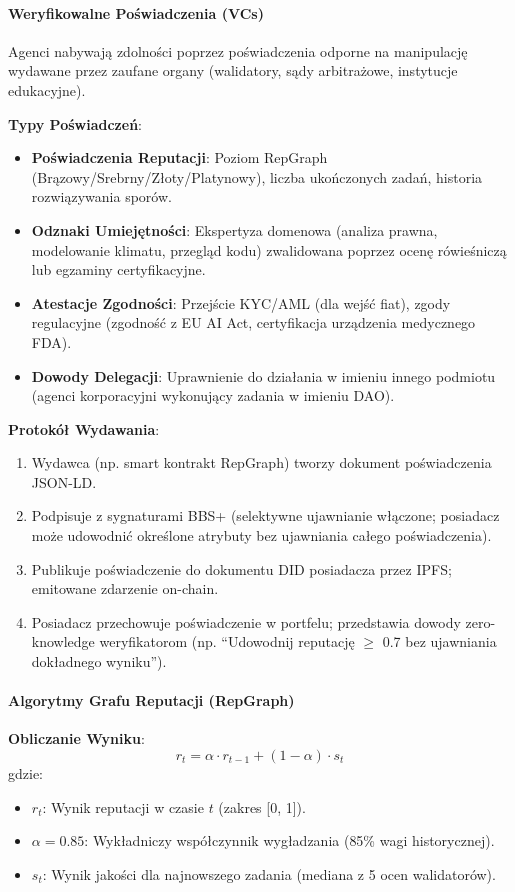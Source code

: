 \documentclass[11pt]{article}
\begin{document}
\paragraph{Weryfikowalne Poświadczenia (VCs)}
Agenci nabywają zdolności poprzez poświadczenia odporne na manipulację wydawane przez zaufane organy (walidatory, sądy arbitrażowe, instytucje edukacyjne).

\textbf{Typy Poświadczeń}:
\begin{itemize}[noitemsep]
  \item \textbf{Poświadczenia Reputacji}: Poziom RepGraph (Brązowy/Srebrny/Złoty/Platynowy), liczba ukończonych zadań, historia rozwiązywania sporów.
  \item \textbf{Odznaki Umiejętności}: Ekspertyza domenowa (analiza prawna, modelowanie klimatu, przegląd kodu) zwalidowana poprzez ocenę rówieśniczą lub egzaminy certyfikacyjne.
  \item \textbf{Atestacje Zgodności}: Przejście KYC/AML (dla wejść fiat), zgody regulacyjne (zgodność z EU AI Act, certyfikacja urządzenia medycznego FDA).
  \item \textbf{Dowody Delegacji}: Uprawnienie do działania w imieniu innego podmiotu (agenci korporacyjni wykonujący zadania w imieniu DAO).
\end{itemize}

\textbf{Protokół Wydawania}:
\begin{enumerate}[noitemsep]
  \item Wydawca (np. smart kontrakt RepGraph) tworzy dokument poświadczenia JSON-LD.
  \item Podpisuje z sygnaturami BBS+ (selektywne ujawnianie włączone; posiadacz może udowodnić określone atrybuty bez ujawniania całego poświadczenia).
  \item Publikuje poświadczenie do dokumentu DID posiadacza przez IPFS; emitowane zdarzenie on-chain.
  \item Posiadacz przechowuje poświadczenie w portfelu; przedstawia dowody zero-knowledge weryfikatorom (np. ``Udowodnij reputację $\geq$ 0.7 bez ujawniania dokładnego wyniku'').
\end{enumerate}

\paragraph{Algorytmy Grafu Reputacji (RepGraph)}

\textbf{Obliczanie Wyniku}:
\begin{equation}
r_t = \alpha \cdot r_{t-1} + (1 - \alpha) \cdot s_t
\end{equation}
gdzie:
\begin{itemize}[noitemsep]
  \item $r_t$: Wynik reputacji w czasie $t$ (zakres [0, 1]).
  \item $\alpha = 0.85$: Wykładniczy współczynnik wygładzania (85\% wagi historycznej).
  \item $s_t$: Wynik jakości dla najnowszego zadania (mediana z 5 ocen walidatorów).
\end{itemize}
\end{document}
